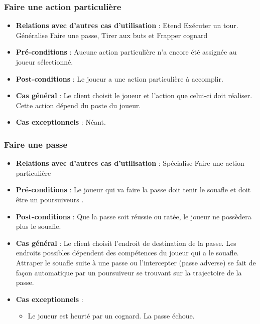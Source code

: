 \documentclass[a4paper,titlepage]{scrreprt}
\begin{document}
    \subsubsection{Faire une action particulière}
      \begin{itemize}
        \item \textbf{Relations avec d'autres cas d'utilisation}  : Etend Exécuter un tour. Généralise Faire une passe, Tirer aux buts et Frapper cognard
        \item \textbf{Pré-conditions} : Aucune action particulière n'a encore été assignée au joueur sélectionné.
        \item \textbf{Post-conditions} : Le joueur a une action particulière à accomplir.
        \item \textbf{Cas général} : Le client choisit le joueur et l’action que celui-ci doit réaliser. Cette action dépend du poste du joueur.
        \item \textbf{Cas exceptionnels} : Néant.
      \end{itemize}
    \subsubsection{Faire une passe}
      \begin{itemize}
        \item \textbf{Relations avec d'autres cas d'utilisation}  : Spécialise Faire une action particulière
        \item \textbf{Pré-conditions} : Le joueur qui va faire la passe doit tenir le \gls{souafle} et doit être un \gls{poursuiveur}s .
        \item \textbf{Post-conditions} : Que la passe soit réussie ou ratée, le joueur ne possèdera plus le souafle.
        \item \textbf{Cas général} : Le client choisit l’endroit de destination de la passe. Les endroits possibles dépendent des compétences du joueur qui a le souafle. Attraper le souafle suite à une passe ou l’intercepter (passe adverse) se fait de façon automatique par un poursuiveur se trouvant sur la trajectoire de la passe.
        \item \textbf{Cas exceptionnels} :
        \begin{itemize}
            \item Le joueur est heurté par un \gls{cognard}. La passe échoue. 
        \end{itemize}
      \end{itemize}
\end{document}
